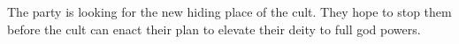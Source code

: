 The party is looking for the new hiding place of the cult.
They hope to stop them before the cult can enact their plan to elevate their deity to full god powers.